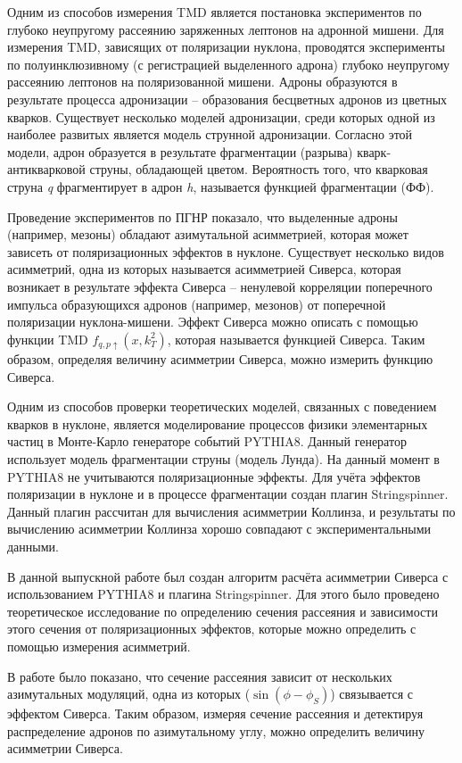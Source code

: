 \documentclass{extreport}
\begin{document}
Одним из способов измерения TMD является постановка экспериментов по глубоко неупругому рассеянию заряженных лептонов на адронной мишени. Для измерения TMD, зависящих от поляризации нуклона, проводятся эксперименты по полуинклюзивному (с регистрацией выделенного адрона) глубоко неупругому рассеянию лептонов на поляризованной мишени. Адроны образуются в результате процесса адронизации -- образования бесцветных адронов из цветных кварков. Существует несколько моделей адронизации, среди которых одной из наиболее развитых является модель струнной адронизации. Согласно этой модели, адрон образуется в результате фрагментации (разрыва) кварк-антикварковой струны, обладающей цветом. Вероятность того, что кварковая струна \textit{q} фрагментирует в адрон \textit{h}, называется функцией фрагментации (ФФ).

Проведение экспериментов по ПГНР показало, что выделенные адроны (например, мезоны) обладают азимутальной асимметрией, которая может зависеть от поляризационных эффектов в нуклоне. Существует несколько видов асимметрий, одна из которых называется асимметрией Сиверса, которая возникает в результате эффекта Сиверса -- ненулевой корреляции поперечного импульса образующихся адронов (например, мезонов) от поперечной поляризации нуклона-мишени. Эффект Сиверса можно описать с помощью функции TMD $f_{q,p\uparrow} (x,k^2_T )$, которая называется функцией Сиверса. Таким образом, определяя величину асимметрии Сиверса, можно измерить функцию Сиверса. 

Одним из способов проверки теоретических моделей, связанных с поведением кварков в нуклоне, является моделирование процессов физики элементарных частиц в Монте-Карло генераторе событий PYTHIA8. Данный генератор использует модель фрагментации струны (модель Лунда). На данный момент в PYTHIA8 не учитываются поляризационные эффекты. Для учёта эффектов поляризации в нуклоне и в процессе фрагментации создан плагин Stringspinner. Данный плагин рассчитан для вычисления асимметрии Коллинза, и результаты по вычислению асимметрии Коллинза хорошо совпадают с экспериментальными данными. 

В данной выпускной работе был создан алгоритм расчёта асимметрии Сиверса с использованием PYTHIA8 и плагина Stringspinner. Для этого было проведено теоретическое исследование по определению сечения рассеяния и зависимости этого сечения от поляризационных эффектов, которые можно определить с помощью измерения асимметрий. 

В работе было показано, что сечение рассеяния зависит от нескольких азимутальных модуляций, одна из которых ($\sin (\phi-\phi_S)$) связывается с эффектом Сиверса. Таким образом, измеряя сечение рассеяния и детектируя распределение адронов по азимутальному углу, можно определить величину асимметрии Сиверса.
\end{document}
